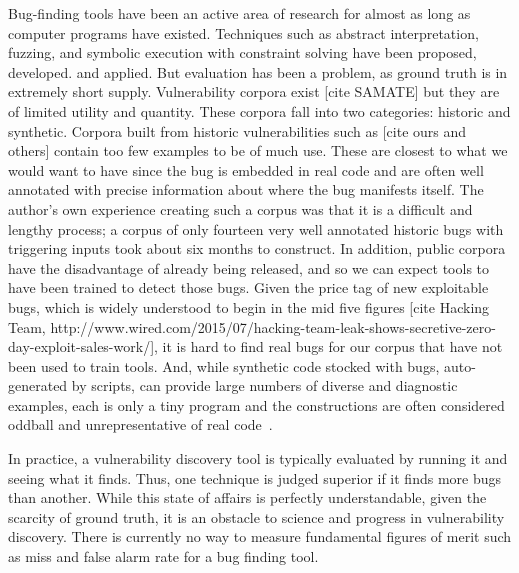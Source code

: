\label{sec:motivation}

Bug-finding tools have been an active area of research for almost as long as computer programs have existed. 
Techniques such as abstract interpretation, fuzzing, and symbolic execution with constraint solving have been proposed, developed. and applied.
But evaluation has been a problem, as  ground truth is in extremely short supply.
Vulnerability corpora exist [cite SAMATE] but they are of limited utility and quantity.
These corpora fall into two categories: historic and synthetic.
Corpora built from historic vulnerabilities such as [cite ours and others] contain too few examples to be of much use.
These are closest to what we would want to have since the bug is embedded in real code and are often well annotated with precise information about where the bug manifests itself.
The author's own experience creating such a corpus was that it is a difficult and lengthy process; a corpus of only fourteen very well annotated historic bugs with triggering inputs took about six months to construct. 
In addition, public corpora have the disadvantage of already being released, and so we can expect tools to have been trained to detect those bugs.
Given the price tag of new exploitable bugs, which is widely understood to begin in the mid five figures [cite Hacking Team, http://www.wired.com/2015/07/hacking-team-leak-shows-secretive-zero-day-exploit-sales-work/], it is hard to find real bugs for our corpus that have not been used to train tools.
And, while synthetic code stocked with bugs, auto-generated by scripts, can provide large numbers of diverse and diagnostic examples, each is only a tiny program and the constructions are often considered oddball and unrepresentative of real code~\cite{kendra}.

In practice, a vulnerability discovery tool is typically evaluated by running it and seeing what it finds. 
Thus, one technique is judged superior if it finds more bugs than another.
While this state of affairs is perfectly understandable, given the scarcity of ground truth, it is an obstacle to science and progress in vulnerability discovery.
There is currently no way to measure fundamental figures of merit such as miss and false alarm rate for a bug finding tool.

